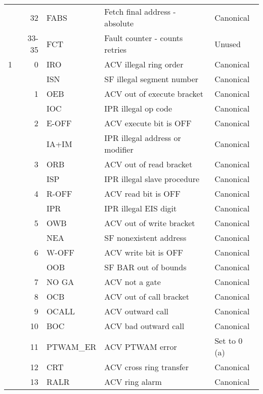 \documentclass[notitlepage]{report}
\begin{document}
\begin{tabular}{lrlll}
     & 32    & FABS      & Fetch final address - absolute      & Canonical \\
     & 33-35 & FCT       & Fault counter - counts retries      & Unused \\
1    & 0     & IRO       & ACV illegal ring order              & Canonical \\
     &       & ISN       & SF illegal segment number           & Canonical \\
     & 1     & OEB       & ACV out of execute bracket          & Canonical \\
     &       & IOC       & IPR illegal op code                 & Canonical \\
     & 2     & E-OFF     & ACV execute bit is OFF              & Canonical \\
     &       & IA+IM     & IPR illegal address or modifier     & Canonical \\
     & 3     & ORB       & ACV out of read bracket             & Canonical \\
     &       & ISP       & IPR illegal slave procedure         & Canonical \\
     & 4     & R-OFF     & ACV read bit is OFF                 & Canonical \\
     &       & IPR       & IPR illegal EIS digit               & Canonical \\
     & 5     & OWB       & ACV out of write bracket            & Canonical \\
     &       & NEA       & SF nonexistent address              & Canonical \\
     & 6     & W-OFF     & ACV write bit is OFF                & Canonical \\
     &       & OOB       & SF BAR out of bounds                & Canonical \\
     & 7     & NO GA     & ACV not a gate                      & Canonical \\
     & 8     & OCB       & ACV out of call bracket             & Canonical \\
     & 9     & OCALL     & ACV outward call                    & Canonical \\
     & 10    & BOC       & ACV bad outward call                & Canonical \\
     & 11    & PTWAM\_ER & ACV PTWAM error                     & Set to 0 (a) \\
     & 12    & CRT       & ACV cross ring transfer             & Canonical \\
     & 13    & RALR      & ACV ring alarm                      & Canonical \\

\end{tabular}
\end{document}
